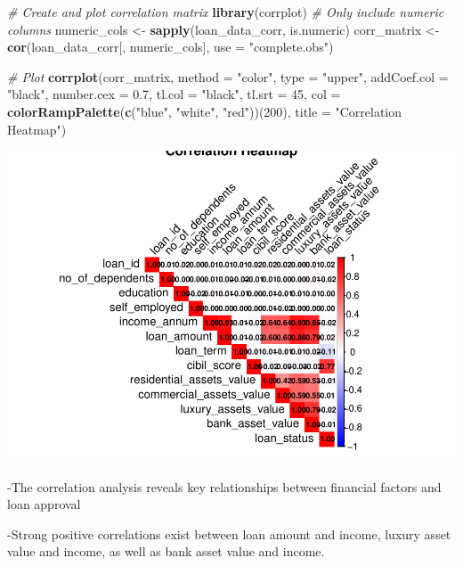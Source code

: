 \documentclass[
]{article}
\newenvironment{Shaded}{\begin{snugshade}}{\end{snugshade}}
\newcommand{\AttributeTok}[1]{\textcolor[rgb]{0.13,0.29,0.53}{#1}}
\newcommand{\CommentTok}[1]{\textcolor[rgb]{0.56,0.35,0.01}{\textit{#1}}}
\newcommand{\DecValTok}[1]{\textcolor[rgb]{0.00,0.00,0.81}{#1}}
\newcommand{\FloatTok}[1]{\textcolor[rgb]{0.00,0.00,0.81}{#1}}
\newcommand{\FunctionTok}[1]{\textcolor[rgb]{0.13,0.29,0.53}{\textbf{#1}}}
\newcommand{\NormalTok}[1]{#1}
\newcommand{\OtherTok}[1]{\textcolor[rgb]{0.56,0.35,0.01}{#1}}
\newcommand{\StringTok}[1]{\textcolor[rgb]{0.31,0.60,0.02}{#1}}
\begin{document}
\begin{Shaded}
\begin{Highlighting}[]
\CommentTok{\# Create and plot correlation matrix}
\FunctionTok{library}\NormalTok{(corrplot)}
\CommentTok{\# Only include numeric columns}
\NormalTok{numeric\_cols }\OtherTok{\textless{}{-}} \FunctionTok{sapply}\NormalTok{(loan\_data\_corr, is.numeric)}
\NormalTok{corr\_matrix }\OtherTok{\textless{}{-}} \FunctionTok{cor}\NormalTok{(loan\_data\_corr[, numeric\_cols], }\AttributeTok{use =} \StringTok{"complete.obs"}\NormalTok{)}

\CommentTok{\# Plot}
\FunctionTok{corrplot}\NormalTok{(corr\_matrix, }\AttributeTok{method =} \StringTok{"color"}\NormalTok{, }\AttributeTok{type =} \StringTok{"upper"}\NormalTok{, }
         \AttributeTok{addCoef.col =} \StringTok{"black"}\NormalTok{, }\AttributeTok{number.cex =} \FloatTok{0.7}\NormalTok{,}
         \AttributeTok{tl.col =} \StringTok{"black"}\NormalTok{, }\AttributeTok{tl.srt =} \DecValTok{45}\NormalTok{,}
         \AttributeTok{col =} \FunctionTok{colorRampPalette}\NormalTok{(}\FunctionTok{c}\NormalTok{(}\StringTok{"blue"}\NormalTok{, }\StringTok{"white"}\NormalTok{, }\StringTok{"red"}\NormalTok{))(}\DecValTok{200}\NormalTok{),}
         \AttributeTok{title =} \StringTok{"Correlation Heatmap"}\NormalTok{)}
\end{Highlighting}
\end{Shaded}

\includegraphics{Loan_approval_files/figure-latex/unnamed-chunk-13-1.pdf}

-The correlation analysis reveals key relationships between financial
factors and loan approval

-Strong positive correlations exist between loan amount and income,
luxury asset value and income, as well as bank asset value and income.
\end{document}
